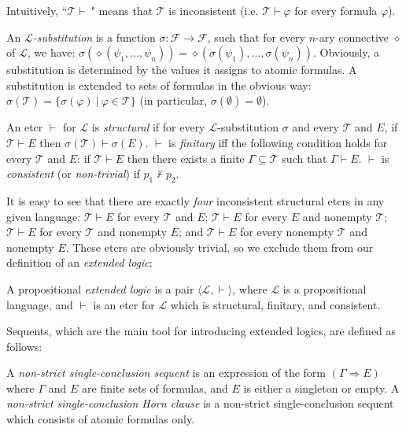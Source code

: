 \documentclass{LMCS}
\theoremstyle{remark}
\newcommand{\lp}{\mathcal{L}}
\newcommand{\T}{\mathcal{T}}
\newcommand{\F}{\mathcal{F}}
\newcommand{\dd}{\diamond}
\newcommand{\psitil}{\psi_1 \til \psi_n}
\newcommand{\Ra}{\Rightarrow}
\newcommand{\g}{\Gamma}
\newcommand{\vd}{\vdash}
\newcommand{\st}{{\ |\ }}   \newcommand{\til}{,\dots,}
\newcommand{\tup}[1]{\langle #1 \rangle}
\newcommand{\fe}{\varphi}
\newcommand{\suq}{\subseteq}
\begin{document}
\noindent Intuitively, ``$\T \vd\ $" means that $\T$ is inconsistent 
(i.e. $\T \vd \fe$ for every formula $\fe$). 

\begin{defi}
\label{substitution}
An {\em $\lp$-substitution} is a function $\sigma : {\F} \to {\F}$, 
such that for every $n$-ary connective $\dd$ of $\lp$, we have:
$\sigma(\dd(\psitil))=\dd(\sigma(\psi_1) \til \sigma(\psi_n))$.
Obviously, a substitution is determined by the values it assigns to atomic formulas.
A substitution is extended to sets of formulas in the obvious way:
 $\sigma(\T)=\{\sigma(\fe)\st \fe\in\T\}$
(in particular, $\sigma(\emptyset)=\emptyset$).
\end{defi}

\begin{defi}
\label{etcr properties}
An etcr $\vd$ for $\lp$ is {\it structural} 
if for every $\lp$-substitution $\sigma$ and every $\T$ and $E$, if
$\T\vd E$ then $\sigma(\T) \vd \sigma(E)$.
$\vd$ is {\em finitary} iff the following condition
holds for every $\T$ and $E$:
if $\T \vd E$ then there exists a
finite $\g \suq \T$ such that
$\g \vd E$.
$\vd$ is {\em consistent} (or {\em non-trivial})
if $p_1\not\vd p_2$.
\end{defi}

It is easy to see that 
there are exactly {\em four} inconsistent structural etcrs 
in any given language: $\T\vd E$ for every $\T$ and $E$;
$\T\vd E$ for every $E$ and nonempty $\T$;
$\T\vd E$ for every $\T$ and nonempty $E$;
and $\T\vd E$ for every nonempty $\T$ and nonempty $E$.
These etcrs are obviously trivial, so we exclude them from
our definition of an {\em extended logic}:

\begin{defi}
\label{elogic}
A propositional {\it extended logic} is a pair $\tup{\lp,\vd}$,
where $\lp$ is a propositional language, and $\vd$ is
an etcr for $\lp$ which is structural, finitary, and consistent. 
\end{defi}

Sequents, which are the main tool for introducing extended logics, are defined as follows:

\begin{defi} 
A {\em non-strict single-conclusion sequent} is an expression of the form $(\g\Ra E)$ where
$\g$ and $E$ are finite sets of formulas, and $E$ is either a singleton or empty.  
A {\em non-strict single-conclusion Horn clause} is 
a non-strict single-conclusion sequent which consists of atomic formulas only.
\end{defi}
\end{document}
